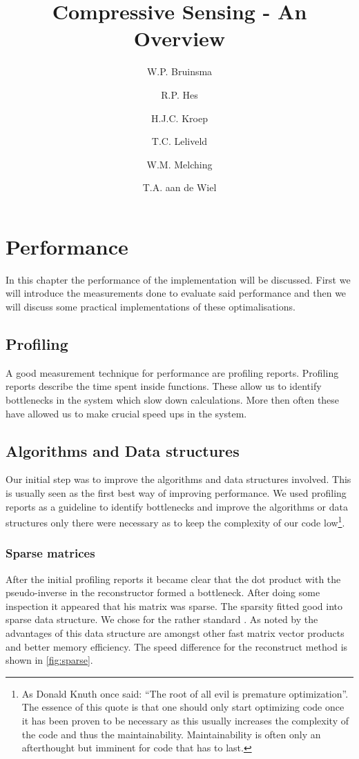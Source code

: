 \documentclass[a4paper, openany, oneside]{memoir}
\title{Compressive Sensing - An Overview}
\author{W.P. Bruinsma \and R.P. Hes \and H.J.C. Kroep \and T.C. Leliveld \and W.M. Melching \and T.A. aan de Wiel}
\begin{document}
\chapter{Performance}
\label{cha:performance}
In this chapter the performance of the implementation will be discussed. First we will introduce the measurements done to evaluate said performance and then we will discuss some practical implementations of these optimalisations.

\section{Profiling}
\label{sec:performance-profiling}
A good measurement technique for performance are profiling reports. Profiling reports describe the time spent inside functions. These allow us to identify bottlenecks in the system which slow down calculations. More then often these have allowed us to make crucial speed ups in the system.

\section{Algorithms and Data structures}
Our initial step was to improve the algorithms and data structures involved. This is usually seen as the first best way of improving performance. We used profiling reports as a guideline to identify bottlenecks and improve the algorithms or data structures only there were necessary as to keep the complexity of our code low\footnote{As Donald Knuth once said: ``The root of all evil is premature optimization''. The essence of this quote is that one should only start optimizing code once it has been proven to be necessary as this usually increases the complexity of the code and thus the maintainability. Maintainability is often only an afterthought but imminent for code that has to last.}.

\subsection{Sparse matrices}
\label{sec:sparse-matrices}
After the initial profiling reports it became clear that the dot product with the pseudo-inverse in the reconstructor formed a bottleneck. After doing some inspection it appeared that his matrix was sparse. The sparsity fitted good into  sparse data structure. We chose for the rather standard . As noted by \cite{numpyscipy} the advantages of this data structure are amongst other fast matrix vector products and better memory efficiency. The speed difference for the reconstruct method is shown in \cref{fig:sparse}.
\end{document}
